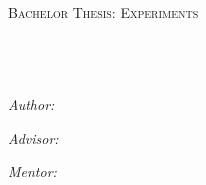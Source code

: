 \documentclass[
10pt, %
twoside, %
english, %
singlespacing, %
headsepline, %
]{BachelorThesis} %
\author{Axel \textsc{Faes}} %
\begin{document}
\frontmatter %

\pagestyle{plain} %


\begin{titlepage}
\begin{center}

\textsc{\LARGE \univname}\\[1.5cm] %

\textsc{\Large Bachelor Thesis: Experiments}\\[0.5cm] %

\HRule \\[0.4cm] %
{\huge \bfseries \ttitle}\\[0.4cm] %
\HRule \\[1cm] %
 
\begin{minipage}{0.4\textwidth}
\begin{flushleft} \large
\emph{Author:}\\
{\authorname} %
\end{flushleft}
\end{minipage}
\begin{minipage}{0.4\textwidth}
\begin{flushright} \large
\emph{Advisor:} \\
{\adname} %

\emph{Mentor:} \\
{\supname} %
\end{flushright}
\end{minipage}\\[5.5cm]
 

\end{center}
\end{titlepage}
\end{document}
